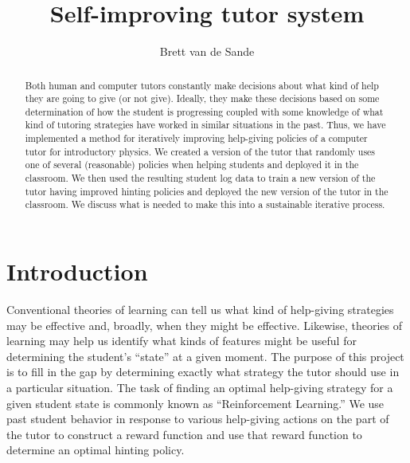 \documentclass[11pt,letterpaper]{article}
\begin{document}
\title{Self-improving tutor system}
\author{Brett van de Sande}

%


\maketitle

\begin{abstract}
Both human and computer tutors constantly make decisions about
what kind of help they are going to give (or not give).  Ideally,
they make these decisions based on some determination of how
the student is progressing coupled with some knowledge of what kind
of tutoring strategies have worked in similar situations in the past.
Thus, we have implemented a method for iteratively improving 
help-giving policies of a computer tutor for introductory physics.  
We created a version of the tutor that randomly uses one of several 
(reasonable) policies when helping students and deployed it in the
classroom.  We then used the resulting student log data to 
train a new version of the tutor having improved hinting policies
and deployed the new version of the tutor in the classroom.  
We discuss what is needed to make this into a sustainable iterative process.
\end{abstract}

\section{Introduction}

Conventional theories of learning can tell us what kind of help-giving
strategies may be effective and, broadly, when they might be effective.
Likewise, theories of learning may help us identify what kinds of 
features might be useful for determining the student's ``state'' at
a given moment.  The purpose of this project is to fill in the gap
by determining exactly what strategy the tutor should use in a 
particular situation.
The task of finding an optimal help-giving strategy for a
given student state is commonly known as ``Reinforcement Learning.''
We use past student behavior in response to various help-giving
actions on the part of the tutor to construct a reward function
and use that reward function to determine an optimal hinting policy.
\end{document}
